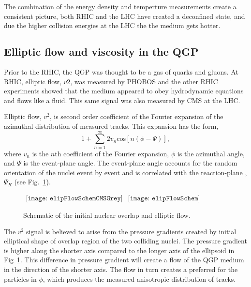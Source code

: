       The combination of the energy density and temperture measurements
        create a consistent picture, both RHIC and the LHC have created a 
        deconfined state, and due the higher collision energies at the LHC the 
        the medium gets hotter. 

    \subsection{Elliptic flow and viscosity in the QGP}
      Prior to the RHIC, the QGP was thought to be a gas of quarks and gluons.
      At RHIC, elliptic flow, $v2$, was measured by PHOBOS \cite{phobosFlow} and the other 
        RHIC experiments showed that the medium appeared to obey hydrodynamic equations and 
        flows like a fluid.
      This same signal was also measured by CMS\cite{cmsFlow} at the LHC. 

      Elliptic flow, $v^{2}$, is second order coefficient of the Fourier 
        expansion of the azimuthal distribution of measured tracks.
      This expansion has the form,
      \begin{equation}
        1+\sum^{\infty}_{n=1}2v_{n}\mathrm{cos}\left[n\left(\phi-\Psi\right)\right],
        \label{eg:v2Expand}
      \end{equation}
        where $v_{n}$ is the $n$th coefficient of the Fourier expansion, $\phi$
        is the azimuthal angle, and $\Psi$ is the event-plane angle.
      The event-plane angle accounts for the random orientation of the 
        nuclei event by event and is correlated with the reaction-plane
        , $\Psi_{R}$ (see Fig.~\ref{fig:elipSchem}).
        
      \begin{figure}[!Hhbt]
        \centering
        $ \begin{array}{cc}
        \texttt{[image: elipFlowSchemCMSGrey]} &
        \texttt{[image: elipFlowSchem]}
        \end{array} $
        \caption{Schematic of the initial nuclear overlap and elliptic flow.}
        \label{fig:elipSchem}
      \end{figure}
  
      The $v^{2}$ signal is believed to arise from the pressure gradients 
        created by initial elliptical shape of overlap region of the 
        two colliding nuclei. 
      The pressure gradient is higher along the shorter axis compared to 
        the longer axis of the ellipsoid in Fig~\ref{fig:elipSchem}.
      This difference in pressure gradient will create a flow of the QGP 
        medium in the direction of the shorter axis. 
      The flow in turn creates a preferred for the particles in $\phi$, which
        produces the measured anisotropic distribution of tracks. 

